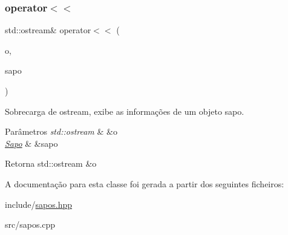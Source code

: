 \subsubsection{\texorpdfstring{operator$<$$<$}{operator<<}}
{\footnotesize\ttfamily std\+::ostream\& operator$<$$<$ (\begin{DoxyParamCaption}\item[{std\+::ostream \&}]{o,  }\item[{\hyperlink{classSapo}{Sapo} \&}]{sapo }\end{DoxyParamCaption})\hspace{0.3cm}{\ttfamily [friend]}}



Sobrecarga de ostream, exibe as informações de um objeto sapo. 


\begin{DoxyParams}{Parâmetros}
{\em std\+::ostream} & \&o \\
\hline
{\em \hyperlink{classSapo}{Sapo}} & \&sapo \\
\hline
\end{DoxyParams}
\begin{DoxyReturn}{Retorna}
std\+::ostream \&o 
\end{DoxyReturn}


A documentação para esta classe foi gerada a partir dos seguintes ficheiros\+:\begin{DoxyCompactItemize}
\item 
include/\hyperlink{sapos_8hpp}{sapos.\+hpp}\item 
src/sapos.\+cpp\end{DoxyCompactItemize}
